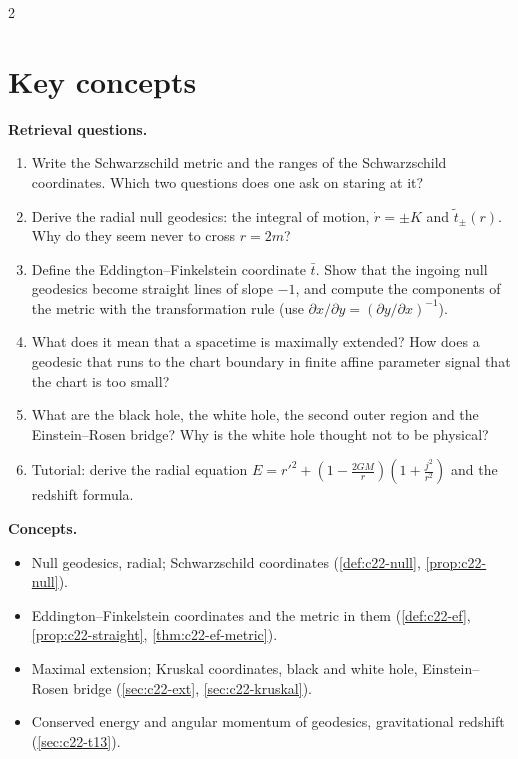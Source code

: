 \begin{paracol}{2}
\section*{Key concepts}
\begin{keyconcepts}
\textbf{Retrieval questions.}
\begin{enumerate}
  \item Write the Schwarzschild metric and the ranges of the Schwarzschild coordinates. Which two questions does one ask on staring at it?
  \item Derive the radial null geodesics: the integral of motion, $\dot r=\pm K$ and $\tilde t_\pm(r)$. Why do they seem never to cross $r=2m$?
  \item Define the Eddington--Finkelstein coordinate $\bar t$. Show that the ingoing null geodesics become straight lines of slope $-1$, and compute the components of the metric with the transformation rule (use $\partial x/\partial y=(\partial y/\partial x)^{-1}$).
  \item What does it mean that a spacetime is maximally extended? How does a geodesic that runs to the chart boundary in finite affine parameter signal that the chart is too small?
  \item What are the black hole, the white hole, the second outer region and the Einstein--Rosen bridge? Why is the white hole thought not to be physical?
  \item Tutorial: derive the radial equation $E=r'^2+(1-\frac{2GM}r)(1+\frac{j^2}{r^2})$ and the redshift formula.
\end{enumerate}
\textbf{Concepts.}
\begin{itemize}
  \item Null geodesics, radial; Schwarzschild coordinates (\cref{def:c22-null}, \cref{prop:c22-null}).
  \item Eddington--Finkelstein coordinates and the metric in them (\cref{def:c22-ef}, \cref{prop:c22-straight}, \cref{thm:c22-ef-metric}).
  \item Maximal extension; Kruskal coordinates, black and white hole, Einstein--Rosen bridge (\cref{sec:c22-ext}, \cref{sec:c22-kruskal}).
  \item Conserved energy and angular momentum of geodesics, gravitational redshift (\cref{sec:c22-t13}).
\end{itemize}
\end{keyconcepts}

\flushside
\end{paracol}
